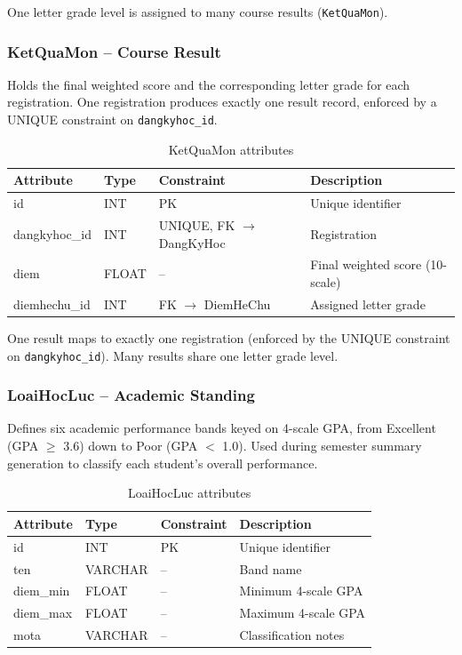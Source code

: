 \documentclass[12pt,a4paper]{report}
\begin{document}
One letter grade level is assigned to many course results (\texttt{KetQuaMon}).

\subsubsection{KetQuaMon -- Course Result}

Holds the final weighted score and the corresponding letter grade for each registration. One registration produces exactly one result record, enforced by a UNIQUE constraint on \texttt{dangkyhoc\_id}.

\begin{table}[H]
\renewcommand{\arraystretch}{1.35}
\caption{KetQuaMon attributes}
\label{tab:ketquamon}
\begin{tabular}{|p{3cm}|p{2.5cm}|p{3cm}|p{5cm}|}
  \hline
  \textbf{Attribute} & \textbf{Type} & \textbf{Constraint} & \textbf{Description} \\
  \hline
  id & INT & PK & Unique identifier \\
  \hline
  dangkyhoc\_id & INT & UNIQUE, FK $\to$ DangKyHoc & Registration \\
  \hline
  diem & FLOAT & -- & Final weighted score (10-scale) \\
  \hline
  diemhechu\_id & INT & FK $\to$ DiemHeChu & Assigned letter grade \\
  \hline
\end{tabular}
\end{table}

One result maps to exactly one registration (enforced by the UNIQUE constraint on \texttt{dangkyhoc\_id}). Many results share one letter grade level.

\subsubsection{LoaiHocLuc -- Academic Standing}

Defines six academic performance bands keyed on 4-scale GPA, from Excellent (GPA $\geq$ 3.6) down to Poor (GPA $<$ 1.0). Used during semester summary generation to classify each student's overall performance.

\begin{table}[H]
\renewcommand{\arraystretch}{1.35}
\caption{LoaiHocLuc attributes}
\label{tab:loaihocluc}
\begin{tabular}{|p{3cm}|p{2.5cm}|p{2.5cm}|p{5.5cm}|}
  \hline
  \textbf{Attribute} & \textbf{Type} & \textbf{Constraint} & \textbf{Description} \\
  \hline
  id & INT & PK & Unique identifier \\
  \hline
  ten & VARCHAR & -- & Band name \\
  \hline
  diem\_min & FLOAT & -- & Minimum 4-scale GPA \\
  \hline
  diem\_max & FLOAT & -- & Maximum 4-scale GPA \\
  \hline
  mota & VARCHAR & -- & Classification notes \\
  \hline
\end{tabular}
\end{table}
\end{document}
